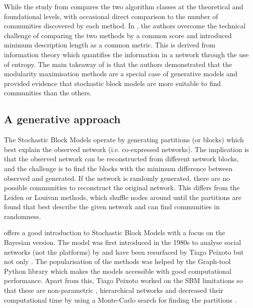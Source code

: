 While the study from \citet{Peixoto2021-jx} compares the two algorithm classes at the theoretical and foundational levels, with occasional direct comparison to the number of communities discovered by each method. In \citet{Peixoto2023-rt}, the authors overcome the technical challenge of comparing the two methods by a common score and introduced minimum description length as a common metric. This is derived from information theory which quantifies the information in a network through the use of entropy. The main takeaway of \citet{Peixoto2023-rt} is that the authors demonstrated that the modularity maximisation methods are a special case of generative models and provided evidence that stochastic block models are more suitable to find communities than the others.

\subsection{A generative approach} \label{s:lit:sbm}


The Stochastic Block Models operate by generating partitions (or blocks) which best explain the observed network (i.e. co-expressed networks). The implication is that the observed network can be reconstructed from different network blocks, and the challenge is to find the blocks with the minimum difference between observed and generated. If the network is randomly generated, there are no possible communities to reconstruct the original network. This differs from the Leiden or Louivan methods, which shuffle nodes around until the partitions are found that best describe the given network and can find communities in randomness. 

\citet{Peixoto2019-fg} offers a good introduction to Stochastic Block Models with a focus on the Bayesian version. The model was first introduced in the 1980s to analyse social networks (not the platforms) by \citet{Holland1983-eu} and have been resurfaced by Tiago Peixoto \citep{Peixoto2014-ls, Peixoto2017-gc, Peixoto2018-ot} but not only \citep{Karrer2011-si}. The popularisation of the methods was helped by the Graph-tool Python library \citep{Peixoto2014-ls} which makes the models accessible with good computational performance. Apart from this, Tiago Peixoto worked on the SBM limitations so that these are non-parametric \citep{Peixoto2017-gc, Peixoto2018-ot}, hierarchical networks \citep{Peixoto2014-yb} and decreased their computational time by using a Monte-Carlo search for finding the partitions \citep{Peixoto2014-ss}.

